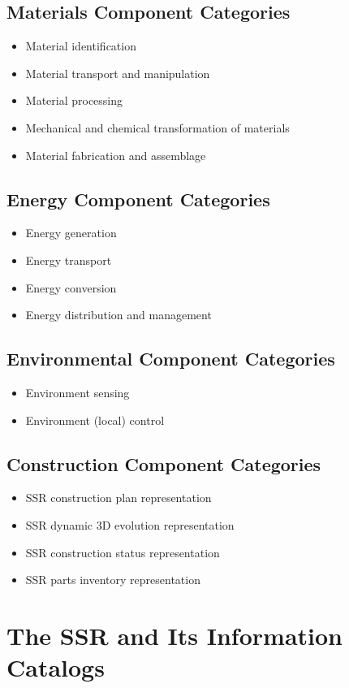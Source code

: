 \subsection{Materials Component Categories}
\begin{itemize}
\item Material identification
\item Material transport and manipulation
\item Material processing
\item Mechanical and chemical transformation of materials
\item Material fabrication and assemblage
\end{itemize}

\subsection{Energy Component Categories}
\begin{itemize}
\item Energy generation
\item Energy transport
\item Energy conversion
\item Energy distribution and management
\end{itemize}

\subsection{Environmental Component Categories}
\begin{itemize}
\item Environment sensing
\item Environment (local) control
\end{itemize}

\subsection{Construction Component Categories}
\begin{itemize}
\item SSR construction plan representation
\item SSR dynamic 3D evolution representation
\item SSR construction status representation
\item SSR parts inventory representation
\end{itemize}

\section{The SSR and Its Information Catalogs}

